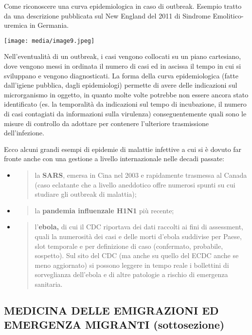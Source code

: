 \documentclass[]{article}
\begin{document}
Come riconoscere una curva epidemiologica in caso di outbreak. Esempio
tratto da una descrizione pubblicata sul New England del 2011 di
Sindrome Emolitico-uremica in Germania.

\texttt{[image: media/image9.jpeg]}

Nell'eventualità di un outbreak, i casi vengono collocati su un piano
cartesiano, dove vengono messi in ordinata il numero di casi ed in
ascissa il tempo in cui si sviluppano e vengono diagnosticati. La forma
della curva epidemiologica (fatte dall'igiene pubblica, dagli
epidemiologi) permette di avere delle indicazioni sul microrganismo in
oggetto, in quanto molte volte potrebbe non essere ancora stato
identificato (es. la temporalità da indicazioni sul tempo di
incubazione, il numero di casi contagiati da informazioni sulla
virulenza) conseguentemente quali sono le misure di controllo da
adottare per contenere l'ulteriore trasmissione dell'infezione.

Ecco alcuni grandi esempi di epidemie di malattie infettive a cui si è
dovuto far fronte anche con una gestione a livello internazionale nelle
decadi passate:

\begin{itemize}
\item
  \begin{quote}
  la \textbf{SARS}, emersa in Cina nel 2003 e rapidamente trasmessa al
  Canada (caso eclatante che a livello aneddotico offre numerosi spunti
  su cui studiare gli outbreak di malattia);
  \end{quote}
\item
  \begin{quote}
  la \textbf{pandemia influenzale H1N1} più recente;
  \end{quote}
\item
  \begin{quote}
  l'\textbf{ebola,} di cui il CDC riportava dei dati raccolti ai fini di
  assessment, quali la numerosità dei casi e delle morti d'ebola
  suddivise per Paese, slot temporale e per definizione di caso
  (confermato, probabile, sospetto). Sul sito del CDC (ma anche su
  quello del ECDC anche se meno aggiornato) si possono leggere in tempo
  reale i bollettini di sorveglianza dell'ebola e di altre patologie a
  rischio di emergenza sanitaria.
  \end{quote}
\end{itemize}

\subsection{MEDICINA DELLE EMIGRAZIONI ED EMERGENZA MIGRANTI
(sottosezione)}\label{medicina-delle-emigrazioni-ed-emergenza-migranti-sottosezione}
\end{document}
